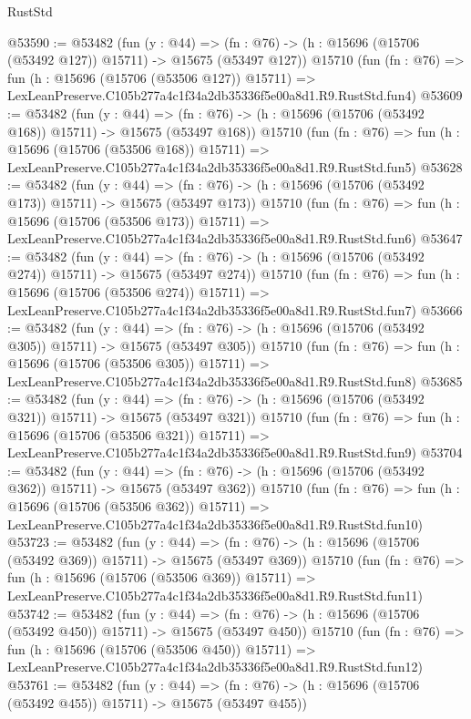 \begin{lexlean}{RustStd}
\begin{coremodule}
@53590 := @53482
    (fun (y : @44) =>
    (fn : @76) -> (h : @15696 (@15706 (@53492 @127)) @15711) -> @15675 (@53497 @127))
    @15710
    (fun (fn : @76) =>
    fun (h : @15696 (@15706 (@53506 @127)) @15711) =>
    LexLeanPreserve.C105b277a4c1f34a2db35336f5e00a8d1.R9.RustStd.fun4)
@53609 := @53482
    (fun (y : @44) =>
    (fn : @76) -> (h : @15696 (@15706 (@53492 @168)) @15711) -> @15675 (@53497 @168))
    @15710
    (fun (fn : @76) =>
    fun (h : @15696 (@15706 (@53506 @168)) @15711) =>
    LexLeanPreserve.C105b277a4c1f34a2db35336f5e00a8d1.R9.RustStd.fun5)
@53628 := @53482
    (fun (y : @44) =>
    (fn : @76) -> (h : @15696 (@15706 (@53492 @173)) @15711) -> @15675 (@53497 @173))
    @15710
    (fun (fn : @76) =>
    fun (h : @15696 (@15706 (@53506 @173)) @15711) =>
    LexLeanPreserve.C105b277a4c1f34a2db35336f5e00a8d1.R9.RustStd.fun6)
@53647 := @53482
    (fun (y : @44) =>
    (fn : @76) -> (h : @15696 (@15706 (@53492 @274)) @15711) -> @15675 (@53497 @274))
    @15710
    (fun (fn : @76) =>
    fun (h : @15696 (@15706 (@53506 @274)) @15711) =>
    LexLeanPreserve.C105b277a4c1f34a2db35336f5e00a8d1.R9.RustStd.fun7)
@53666 := @53482
    (fun (y : @44) =>
    (fn : @76) -> (h : @15696 (@15706 (@53492 @305)) @15711) -> @15675 (@53497 @305))
    @15710
    (fun (fn : @76) =>
    fun (h : @15696 (@15706 (@53506 @305)) @15711) =>
    LexLeanPreserve.C105b277a4c1f34a2db35336f5e00a8d1.R9.RustStd.fun8)
@53685 := @53482
    (fun (y : @44) =>
    (fn : @76) -> (h : @15696 (@15706 (@53492 @321)) @15711) -> @15675 (@53497 @321))
    @15710
    (fun (fn : @76) =>
    fun (h : @15696 (@15706 (@53506 @321)) @15711) =>
    LexLeanPreserve.C105b277a4c1f34a2db35336f5e00a8d1.R9.RustStd.fun9)
@53704 := @53482
    (fun (y : @44) =>
    (fn : @76) -> (h : @15696 (@15706 (@53492 @362)) @15711) -> @15675 (@53497 @362))
    @15710
    (fun (fn : @76) =>
    fun (h : @15696 (@15706 (@53506 @362)) @15711) =>
    LexLeanPreserve.C105b277a4c1f34a2db35336f5e00a8d1.R9.RustStd.fun10)
@53723 := @53482
    (fun (y : @44) =>
    (fn : @76) -> (h : @15696 (@15706 (@53492 @369)) @15711) -> @15675 (@53497 @369))
    @15710
    (fun (fn : @76) =>
    fun (h : @15696 (@15706 (@53506 @369)) @15711) =>
    LexLeanPreserve.C105b277a4c1f34a2db35336f5e00a8d1.R9.RustStd.fun11)
@53742 := @53482
    (fun (y : @44) =>
    (fn : @76) -> (h : @15696 (@15706 (@53492 @450)) @15711) -> @15675 (@53497 @450))
    @15710
    (fun (fn : @76) =>
    fun (h : @15696 (@15706 (@53506 @450)) @15711) =>
    LexLeanPreserve.C105b277a4c1f34a2db35336f5e00a8d1.R9.RustStd.fun12)
@53761 := @53482
    (fun (y : @44) =>
    (fn : @76) -> (h : @15696 (@15706 (@53492 @455)) @15711) -> @15675 (@53497 @455))

\end{coremodule}
\end{lexlean}
